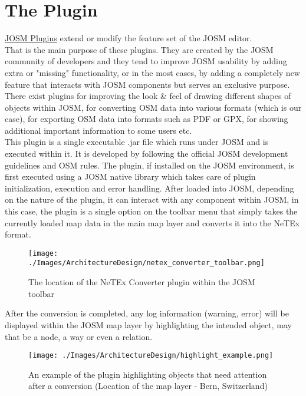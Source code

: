 \section{The Plugin}
\label{sec:ThePlugin}
\href{https://wiki.openstreetmap.org/wiki/JOSM/Plugins}{JOSM Plugins} extend or modify the feature set of the JOSM editor. \cite{JOSMPlugins}\\
That is the main purpose of these plugins. They are created by the JOSM community of developers and they tend to improve JOSM usability by adding extra or "missing" functionality, or in the most cases, by adding a completely new feature that interacts with JOSM components but serves an exclusive purpose.\\
There exist plugins for improving the look \& feel of drawing different shapes of objects within JOSM, for converting OSM data into various formats (which is our case), for exporting OSM data into formats such as PDF or GPX, for showing additional important information to some users etc.\\
\newline
This plugin is a single executable .jar file which runs under JOSM and is executed within it. It is developed by following the official JOSM development guidelines and OSM rules. The plugin, if installed on the JOSM environment, is first executed using a JOSM native library which takes care of plugin initialization, execution and error handling. After loaded into JOSM, depending on the nature of the plugin, it can interact with any component within JOSM, in this case, the plugin is a single option on the toolbar menu that simply takes the currently loaded map data in the main map layer and converts it into the NeTEx format. \\
\begin{figure}[H]
	\texttt{[image: ./Images/ArchitectureDesign/netex\_converter\_toolbar.png]}
	\caption{The location of the NeTEx Converter plugin within the JOSM toolbar}
\end{figure}
After the conversion is completed, any log information (warning, error) will be displayed within the JOSM map layer by highlighting the intended object, may that be a node, a way or even a relation.
\begin{figure}[H]
	\texttt{[image: ./Images/ArchitectureDesign/highlight\_example.png]}
	\caption{An example of the plugin highlighting objects that need attention after a conversion (Location of the map layer - Bern, Switzerland)}
\end{figure}
